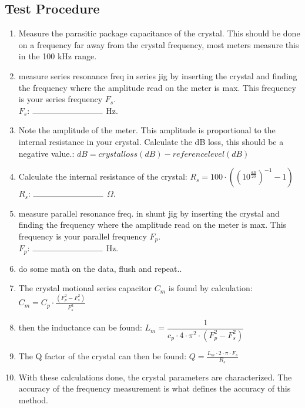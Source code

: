 \documentclass[10pt,letterpaper]{book}
\begin{document}
\subsection*{Test Procedure}
\begin{enumerate}
	\item Measure the parasitic package capacitance of the crystal. This should be done on a frequency far away from the crystal frequency, most meters measure this in the 100 kHz range. 
	\item  measure series resonance freq in series jig by inserting the crystal and finding the frequency where the amplitude read on the meter is max. This frequency is your series frequency $F_{s}$.
	\vspace{30pt}
	\\$F_{s}$: $\rule{3cm}{0.1mm}$ Hz.
	
\item Note the amplitude of the meter. This amplitude is proportional to the internal resistance in your crystal. Calculate the dB loss, this should be a negative value.: $ dB = crystal loss (dB) - reference level (dB) $\\
	\item Calculate the internal resistance of the crystal: $ R_{s} = 100\cdot((10^{\frac{dB}{20}})^{-1}-1) $
	\vspace{30pt}
	\\$R_{s}$: $\rule{3cm}{0.1mm}$ $\Omega$. 
\item measure parallel resonance freq. in shunt jig by inserting the crystal and finding the frequency where the amplitude read on the meter is max. This frequency is your parallel frequency $F_{p}$.
	\vspace{30pt} 
	\\$F_{p}$: $\rule{3cm}{0.1mm}$ Hz.
\item do some math on the data, flush and repeat.. 
\item The crystal motional series capacitor $C_{m}$ is found by calculation: \\ $ C_{m} = C_{p}\cdot\frac{(F_{p}^{2}-F_{s}^{2})}{F_{s}^{2}} $
\item then the inductance can be found: $ L_{m} = \dfrac{1}{c_{p}\cdot 4 \cdot \pi^{2} \cdot (F_{p}^{2}-F_{s}^{2}) } $
\item The Q factor of the crystal can then be found: $ Q = \frac{L_{m}\cdot 2 \cdot \pi \cdot F_{s}}{R_{s}}   $

\item With these calculations done, the crystal parameters are characterized. The accuracy of the frequency measurement is what defines the accuracy of this method. 

\end{enumerate}
\end{document}
